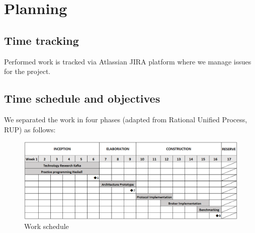 

\section{Planning}

\subsection{Time tracking}
Performed work is tracked via Atlassian JIRA platform where we manage issues for
the project. 

\subsection{Time schedule and objectives}

We separated the work in four phases (adapted from Rational Unified Process,
RUP) as follows:  

\begin{figure}[H]
    \centering
    \includegraphics[width=1\textwidth]{images/workschedule.png}
    \caption{Work schedule}
    \label{fig:MBig:the-log}
\end{figure}

